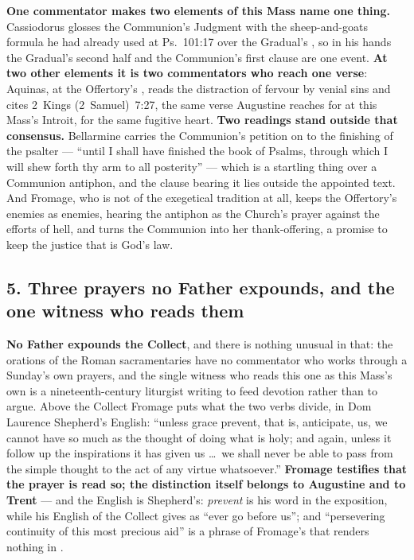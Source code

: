 \textbf{One commentator makes two elements of this Mass name one thing.}
Cassiodorus glosses the Communion's Judgment with the sheep-and-goats
formula he had already used at Ps.~101:17 over the Gradual's , so in his hands the Gradual's second half and the Communion's
first clause are one event. \textbf{At two other elements it is two commentators
who reach one verse}: Aquinas, at the Offertory's , reads the distraction of fervour by venial sins and cites
2~Kings (2~Samuel)~7:27, the same verse Augustine reaches for at this Mass's
Introit, for the same fugitive heart. \textbf{Two readings stand outside that consensus.} Bellarmine carries the Communion's petition on to
the finishing of the psalter --- ``until I shall have finished the book of
Psalms, through which I will shew forth thy arm to all posterity'' --- which is a
startling thing over a Communion antiphon, and the clause bearing it lies outside
the appointed text. And Fromage, who is not of the exegetical tradition at all,
keeps the Offertory's enemies as enemies, hearing the antiphon as the Church's
prayer against the efforts of hell, and turns the Communion into her
thank-offering, a promise to keep the justice that is God's law.

\subsection*{5. Three prayers no Father expounds, and the one witness who reads them}

\textbf{No Father expounds the Collect}, and there is nothing unusual in that:
the orations of the Roman sacramentaries have no commentator who works through a
Sunday's own prayers, and the single witness who reads this one as this Mass's
own is a nineteenth-century liturgist writing to feed devotion rather than to
argue. Above the Collect Fromage puts what the two verbs divide, in Dom Laurence
Shepherd's English: ``unless grace prevent, that is, anticipate, us, we cannot have so much as the
thought of doing what is holy; and again, unless it follow up the inspirations it
has given us \dots\ we shall never be able to pass from the simple thought to the
act of any virtue whatsoever.'' \textbf{Fromage testifies that the prayer is read
so; the distinction itself belongs to Augustine and
to Trent} --- and the English is Shepherd's: \emph{prevent} is his word in the
exposition, while his English of the Collect gives  as ``ever go
before us''; and ``persevering continuity of
this most precious aid'' is a phrase of Fromage's that renders nothing in
.

